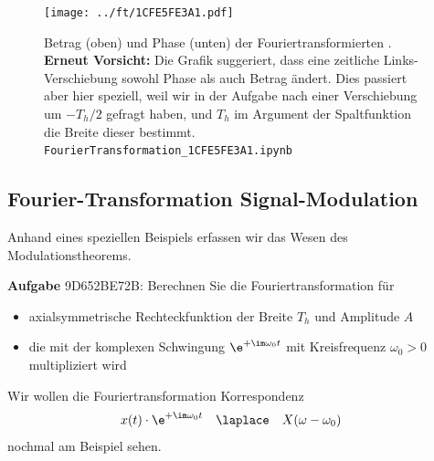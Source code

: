 %
\begin{figure}[h!]
\texttt{[image: ../ft/1CFE5FE3A1.pdf]}
  \caption{Betrag (oben) und Phase (unten) der Fouriertransformierten .
\textbf{Erneut Vorsicht:} Die Grafik suggeriert, dass eine zeitliche Links-Verschiebung
sowohl Phase als auch Betrag ändert. Dies passiert aber hier speziell, weil wir in der
Aufgabe nach einer Verschiebung um $-T_h/2$ gefragt haben, und $T_h$
im Argument der Spaltfunktion die Breite dieser bestimmt.
\texttt{FourierTransformation\_1CFE5FE3A1.ipynb}}
  \label{fig:1CFE5FE3A1}
\end{figure}





\clearpage
\subsection{Fourier-Transformation Signal-Modulation}
\label{sec:9D652BE72B}
\begin{Ziel}
Anhand eines speziellen Beispiels erfassen wir das Wesen des Modulationstheorems.
\end{Ziel}
\textbf{Aufgabe} {\tiny 9D652BE72B}: Berechnen Sie die Fouriertransformation für
\begin{itemize}
\item axialsymmetrische Rechteckfunktion der Breite $T_h$ und Amplitude $A$
\item die mit der komplexen Schwingung $\e^{+\im \omega_0 t}$ mit Kreisfrequenz $\omega_0>0$
multipliziert wird
\end{itemize}
Wir wollen die Fouriertransformation Korrespondenz 
\begin{align}
x(t) \cdot \e^{+\im\omega_0 t} & \quad \laplace \quad X(\omega-\omega_0)
\end{align}
nochmal am Beispiel sehen.

\begin{figure}[h!]
\centering
{}
\end{figure}


